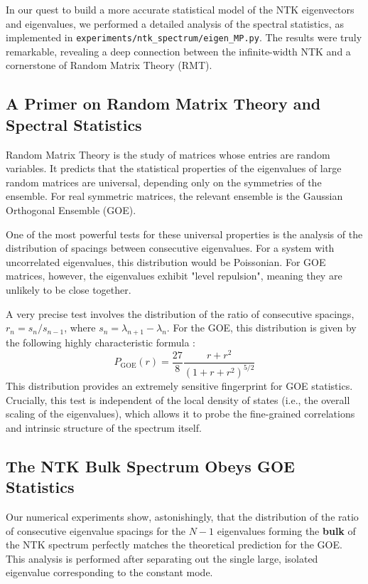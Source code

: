 \documentclass[a4paper]{article}
\begin{document}
In our quest to build a more accurate statistical model of the NTK eigenvectors and eigenvalues, we performed a detailed analysis of the spectral statistics, as implemented in \verb|experiments/ntk_spectrum/eigen_MP.py|. The results were truly remarkable, revealing a deep connection between the infinite-width NTK and a cornerstone of Random Matrix Theory (RMT).

\subsection{A Primer on Random Matrix Theory and Spectral Statistics}
Random Matrix Theory is the study of matrices whose entries are random variables. It predicts that the statistical properties of the eigenvalues of large random matrices are universal, depending only on the symmetries of the ensemble. For real symmetric matrices, the relevant ensemble is the Gaussian Orthogonal Ensemble (GOE).

One of the most powerful tests for these universal properties is the analysis of the distribution of spacings between consecutive eigenvalues. For a system with uncorrelated eigenvalues, this distribution would be Poissonian. For GOE matrices, however, the eigenvalues exhibit "level repulsion", meaning they are unlikely to be close together.

A very precise test involves the distribution of the ratio of consecutive spacings, $r_n = s_n / s_{n-1}$, where $s_n = \lambda_{n+1} - \lambda_n$. For the GOE, this distribution is given by the following highly characteristic formula \cite{atas2013distribution}:
\begin{equation}
P_{\text{GOE}}(r) = \frac{27}{8} \frac{r + r^2}{(1 + r + r^2)^{5/2}}
\label{eq:goe_ratio_dist}
\end{equation}
This distribution provides an extremely sensitive fingerprint for GOE statistics. Crucially, this test is independent of the local density of states (i.e., the overall scaling of the eigenvalues), which allows it to probe the fine-grained correlations and intrinsic structure of the spectrum itself.

\subsection{The NTK Bulk Spectrum Obeys GOE Statistics}
Our numerical experiments show, astonishingly, that the distribution of the ratio of consecutive eigenvalue spacings for the $N-1$ eigenvalues forming the \textbf{bulk} of the NTK spectrum perfectly matches the theoretical prediction for the GOE. This analysis is performed after separating out the single large, isolated eigenvalue corresponding to the constant mode.
\end{document}
